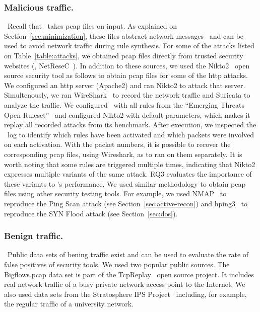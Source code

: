 \documentclass[sigconf,review, anonymous]{acmart}
\begin{document}
\subsubsection{\label{subsec:malicious-traffic}Malicious traffic.}~Recall that \tname\ takes
pcap files on input. As explained on Section~\ref{sec:minimization},
these files abstract network messages~\cite{pcap} and can be used to
avoid network traffic during rule synthesis. For some of the attacks
listed on Table~\ref{table:attacks}, we obtained pcap files directly
from trusted security websites (\eg{},
NetReseC~\cite{pcap-attacks}). In addition to these sources, we used
the Nikto2~\cite{nikto} open source security tool as follows to obtain
pcap files for some of the http attacks. We configured an http server
(Apache2) and ran Nikto2 to attack that server. Simultenously, we ran
WireShark~\cite{wireshark-net-monitor} to record the network traffic
and Suricata to analyze the traffic. We configured \suri\ with all
rules from the ``Emerging Threats Open
Ruleset''~\cite{emerging-threats-open} and configured Nikto2 with
default parameters, which makes it replay all recorded attacks from
its benchmark. After execution, we inspected the \suri\ log to
identify which rules have been activated and which packets were
involved on each activation. With the packet numbers, it is possible
to recover the corresponding pcap files, using Wireshark, as to ran
\tname{} on them separately. It is worth noting that some rules are
triggered multiple times, indicating that Nikto2 expresses multiple
variants of the same attack. RQ3 evaluates the importance of these
variants to \tname{}'s performance. We used similar methodology to
obtain pcap files using other security testing tools. For example, we
used NMAP~\cite{netmap} to reproduce the Ping Scan attack (see
Section~\ref{sec:active-recon}) and hping3~\cite{hping3} to reproduce
the SYN Flood attack (see Section~\ref{sec:dos}).

\vspace{1ex}
\subsubsection{\label{sec:objectanalysis-benign}Benign traffic.}~Public data sets of bening traffic
exist and can be used to evaluate the rate of false positives of
security tools. We used two popular public sources. The Bigflows.pcap
data set is part of the TcpReplay~\cite{tcpreplay} open source
project. It includes real network traffic of a busy private network
access point to the Internet. We also used data sets from the
Stratosphere IPS Project~\cite{stratosphere-normal} including, for
example, the regular traffic of a university network.
\end{document}
